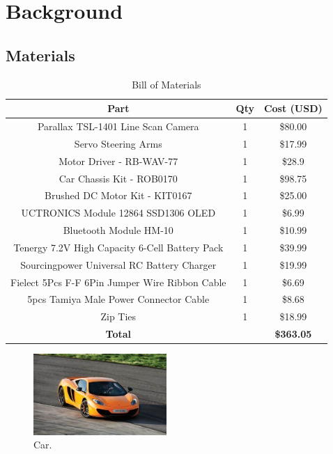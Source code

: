\documentclass[conference]{IEEEtran}
\begin{document}
\section{Background}

\subsection{Materials}

\begin{table}[htbp]
\caption{Bill of Materials}
\begin{center}
\begin{tabular}{|c|c|c|}
\hline
Part & Qty & Cost (USD) \\
\hline
Parallax TSL-1401 Line Scan Camera & 1 & \$80.00 \\
\hline
Servo Steering Arms & 1 & \$17.99 \\
\hline
Motor Driver - RB-WAV-77 & 1 & \$28.9 \\
\hline
Car Chassis Kit - ROB0170 & 1 & \$98.75 \\
\hline
Brushed DC Motor Kit - KIT0167 & 1 & \$25.00 \\
\hline
UCTRONICS Module 12864 SSD1306 OLED & 1 & \$6.99 \\
\hline
Bluetooth Module HM-10 & 1 & \$10.99 \\
\hline
Tenergy 7.2V High Capacity 6-Cell Battery Pack & 1 & \$39.99 \\
\hline
Sourcingpower Universal RC Battery Charger & 1 & \$19.99 \\
\hline
Fielect 5Pcs F-F 6Pin Jumper Wire Ribbon Cable & 1 & \$6.69 \\
\hline
5pcs Tamiya Male Power Connector Cable & 1 & \$8.68 \\
\hline
Zip Ties & 1 & \$18.99 \\
\hline
\textbf{Total} & & \textbf{\$363.05} \\
\hline
\end{tabular}
\label{billOfMaterials}
\end{center}
\end{table}

\begin{figure}[htbp]
	\centerline{\includegraphics[width=0.45\textwidth]{images/car.jpg}}
	\caption{Car.}
	\label{fig}
\end{figure}
\end{document}

